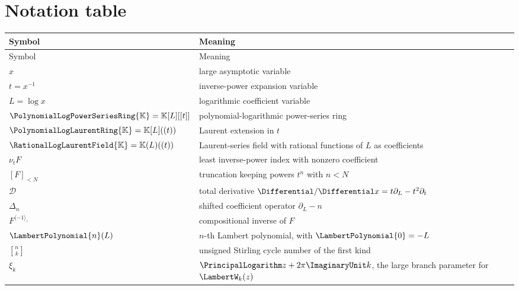 \documentclass[11pt]{article}
\theoremstyle{pltheorem}
\newcommand{\K}{\mathbb K}
\newcommand{\PL}{\PolynomialLogPowerSeriesRing{\K}}
\newcommand{\PLL}{\PolynomialLogLaurentRing{\K}}
\newcommand{\QPL}{\RationalLogLaurentField{\K}}
\newcommand{\ordt}{\nu_t}
\newcommand{\rev}{\langle-1\rangle_{\circ}}
\newcommand{\stirlingone}[2]{\genfrac{[}{]}{0pt}{}{#1}{#2}}
\newcommand{\D}{\mathcal D}
\begin{document}
\section{Notation table}
\label{app:notation}

\begin{longtable}{@{}p{}p{}@{}}
\toprule
Symbol & Meaning\\
\midrule
\endfirsthead
\toprule
Symbol & Meaning\\
\midrule
\endhead
\(x\) & large asymptotic variable\\
\(t=x^{-1}\) & inverse-power expansion variable\\
\(L=\log x\) & logarithmic coefficient variable\\
\(\PL=\K[L][[t]]\) & polynomial-logarithmic power-series ring\\
\(\PLL=\K[L]((t))\) & Laurent extension in \(t\)\\
\(\QPL=\K(L)((t))\) & Laurent-series field with rational functions of \(L\) as coefficients\\
\(\ordt F\) & least inverse-power index with nonzero coefficient\\
\([F]_{<N}\) & truncation keeping powers \(t^n\) with \(n<N\)\\
\(\D\) & total derivative \(\Differential/\Differential x=t\partial_L-t^2\partial_t\)\\
\(\Delta_n\) & shifted coefficient operator \(\partial_L-n\)\\
\(F^{\rev}\) & compositional inverse of \(F\)\\
\(\LambertPolynomial{n}(L)\) & \(n\)-th Lambert polynomial, with \(\LambertPolynomial{0}=-L\)\\
\(\stirlingone{n}{k}\) & unsigned Stirling cycle number of the first kind\\
\(\xi_k\) & \(\PrincipalLogarithm z+2\pi\ImaginaryUnit k\), the large branch parameter for \(\LambertW_k(z)\)\\
\bottomrule
\end{longtable}
\end{document}
